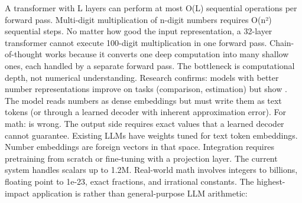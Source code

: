 {}
\markdownRendererSectionEnd \markdownRendererSectionBegin
{}\markdownRendererInterblockSeparator
{}\markdownRendererParagraphSeparator
{}A transformer with L layers can perform at most O(L) sequential operations per forward pass. Multi-digit multiplication of n-digit numbers requires O(n²) sequential steps. No matter how good the input representation, a 32-layer transformer cannot execute 100-digit multiplication in one forward pass.\markdownRendererParagraphSeparator
{}Chain-of-thought works because it converts one deep computation into many shallow ones, each handled by a separate forward pass. The bottleneck is computational depth, not numerical understanding.\markdownRendererParagraphSeparator
{}Research confirms: models with better number representations improve on  tasks (comparison, estimation) but show .\markdownRendererInterblockSeparator
{}
\markdownRendererSectionEnd \markdownRendererSectionBegin
{}\markdownRendererInterblockSeparator
{}\markdownRendererOlBegin
{} The model reads numbers as dense embeddings but must write them as text tokens (or through a learned decoder with inherent approximation error). For math:  is wrong. The output side requires exact values that a learned decoder cannot guarantee.\markdownRendererOlItemEnd 
{} Existing LLMs have weights tuned for text token embeddings. Number embeddings are foreign vectors in that space. Integration requires pretraining from scratch or fine-tuning with a projection layer.\markdownRendererOlItemEnd 
{} The current system handles scalars up to \markdownRendererTilde{}1.2M. Real-world math involves integers to billions, floating point to 1e-23, exact fractions, and irrational constants.\markdownRendererOlItemEnd 
\markdownRendererOlEnd \markdownRendererInterblockSeparator
{}
\markdownRendererSectionEnd \markdownRendererSectionBegin
{}\markdownRendererInterblockSeparator
{}The highest-impact application is  rather than general-purpose LLM arithmetic:\markdownRendererInterblockSeparator
